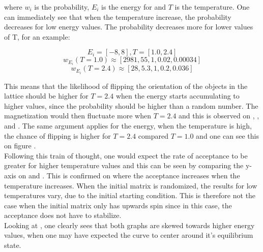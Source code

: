 \documentclass[10pt,a4paper]{article}
\begin{document}
\noindent where $w_i$ is the probability, $E_i$ is the energy for and $T$ is the temperature. One can immediately see that when the temperature increase, the probability decreases for low energy values. The probability decreases more for lower values of T, for an example:

$$
E_i = [-8,8] , T = [1.0,2.4]
$$
$$
w_{E_i}(T = 1.0) \approx [2981, 55, 1, 0.02, 0.00034]
$$
$$
w_{E_i}(T = 2.4) \approx [28, 5.3, 1, 0.2, 0.036]
$$

\noindent This means that the likelihood of flipping the orientation of the objects in the lattice should be higher for $T = 2.4$ when the energy starts accumulating to higher values, since the probability should be higher than a random number. The magnetization would then fluctuate more when $T = 2.4$ and this is observed on , ,  and . The same argument applies for the energy, when the temperature is high, the chance of flipping is higher for $T = 2.4$ compared $T = 1.0$ and one can see this on figure  .
\\
Following this train of thought, one would expect the rate of acceptance to be greater for higher temperature values and this can be seen by comparing the y-axis on  and . This is confirmed on  where the acceptance increases when the temperature increases. When the initial matrix is randomized, the results for low temperatures vary, due to the initial starting condition. This is therefore not the case when the initial matrix only has upwards spin since in this case, the acceptance does not have to stabilize.
\\
Looking at , one clearly sees that both graphs are skewed towards higher energy values, when one may have expected the curve to center around it's equilibrium state. 
\end{document}
